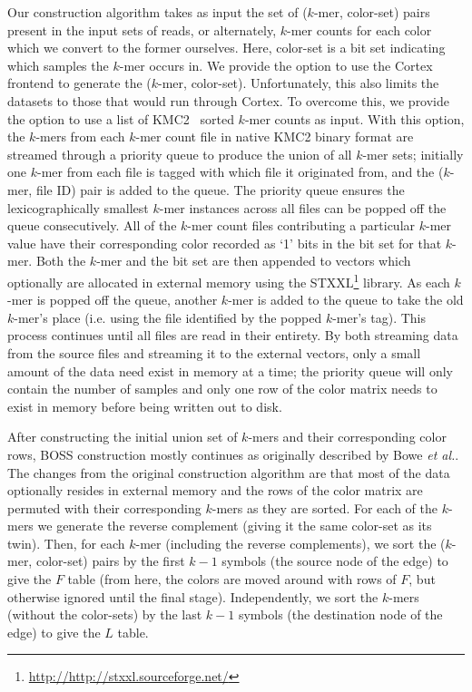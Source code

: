 \documentclass[doctor]{thesis}
\begin{document}
Our construction algorithm takes as input the set of ($k$-mer, color-set) pairs present in the input sets of reads, or alternately, $k$-mer counts for each color which we convert to the former ourselves.
Here, color-set is a bit set indicating which samples the $k$-mer occurs in.
We provide the option to use the {\sc Cortex} frontend to generate the ($k$-mer, color-set). Unfortunately, this also limits the datasets to those that would run through {\sc Cortex}.  To overcome this, we provide the option to use a list of KMC2~\citep{KMC2} sorted $k$-mer counts as input.  With this option, the $k$-mers from each $k$-mer count file in native KMC2 binary format are streamed through a priority queue to produce the union of all $k$-mer sets; initially one $k$-mer from each file is tagged with  which file it originated from, and the ($k$-mer, file ID) pair is added to the queue.   The priority queue ensures the lexicographically smallest $k$-mer instances across all files can be popped off the queue consecutively.  All of the $k$-mer count files contributing a particular $k$-mer value have their corresponding color recorded as `1' bits in the bit set for that $k$-mer.  Both the $k$-mer and the bit set are then appended to vectors which optionally are allocated in external memory using the STXXL\footnote{\url{http://http://stxxl.sourceforge.net/}} library.   As each $k$-mer is popped off the queue, another $k$-mer is added to the queue to take the old $k$-mer's place (i.e. using the file identified by the popped $k$-mer's tag).  This process continues until all files are read in their entirety.  By both streaming data from the source files and streaming it to the external vectors, only a small amount of the data need exist in memory at a time; the priority queue will only contain the number of samples and only one row of the color matrix needs to exist in memory before being written out to disk.


After constructing the initial union set of $k$-mers and their corresponding color rows, BOSS construction mostly continues as originally described by Bowe {\it et al.}.  The changes from the original construction algorithm are that most of the data optionally resides in external memory and the rows of the color matrix are permuted with their corresponding $k$-mers as they are sorted.  For each of the $k$-mers we generate the reverse complement (giving it the same color-set as its twin). Then, for each $k$-mer (including the reverse complements),
we sort the ($k$-mer, color-set) pairs by the first $k-1$ symbols (the source node of the edge) to give the $F$ table (from here, the colors are moved around with rows of $F$, but otherwise ignored until 
the final stage). Independently, we sort the $k$-mers (without the color-sets) by the last $k-1$ symbols (the destination node of the edge) to give the $L$ table.
\end{document}
